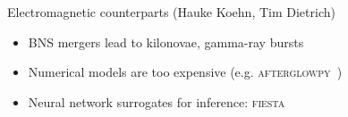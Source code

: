 \documentclass[usenames,dvipsnames,t]{beamer}
\newcommand{\ghlink}[1]{\href{https://github.com/#1}{\textcolor{black}{\faGithub}}}
\begin{document}
\begin{frame}{Electromagnetic counterparts \small (Hauke Koehn, Tim Dietrich) \normalsize}
  \def\x{2mm}

  \begin{itemize}
    \item BNS mergers lead to kilonovae, gamma-ray bursts

    \vspace{\x}
    
    \item Numerical models are too expensive (e.g. \textsc{afterglowpy}~\cite{Ryan:2019fhz})
      
    \vspace{\x}

    \item<2-> Neural network surrogates for inference: \textsc{fiesta}~\ghlink{ThibeauWouters/fiestaEM}
  \end{itemize}

\end{frame}
\end{document}
